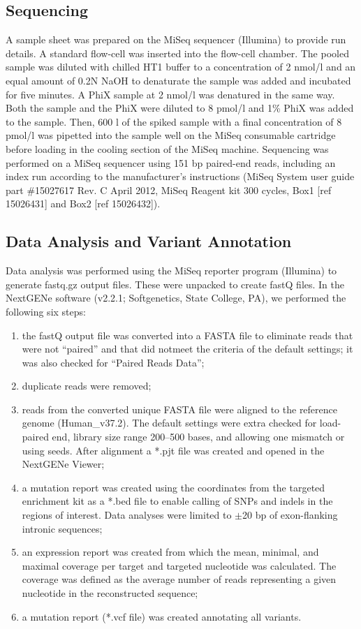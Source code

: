 \subsection{Sequencing}
A sample sheet was prepared on the MiSeq sequencer (Illumina) to provide run details. 
A standard flow-cell was inserted into the flow-cell chamber. 
The pooled sample was diluted with chilled HT1 buffer to a concentration of 2 nmol/l and an equal amount of 0.2N NaOH to denaturate the sample was added and incubated for five minutes. 
A PhiX sample at 2 nmol/l was denatured in the same way. 
Both the sample and the PhiX were diluted to 8 pmol/l and 1\% PhiX was added to the sample. 
Then, 600 {\textmu}l of the spiked sample with a final concentration of 8 pmol/l was pipetted into the sample well on the MiSeq consumable cartridge before loading in the cooling section of the MiSeq machine. 
Sequencing was performed on a MiSeq sequencer using 151 bp paired-end reads, including an index run according to the manufacturer’s instructions (MiSeq System user guide part \#15027617 Rev. C April 2012, MiSeq Reagent kit 300 cycles, Box1 [ref 15026431] and Box2 [ref 15026432]).

\subsection{Data Analysis and Variant Annotation}

Data analysis was performed using the MiSeq reporter program (Illumina) to generate fastq.gz output files. 
These were unpacked to create fastQ files. 
In the NextGENe software (v2.2.1; Softgenetics, State College, PA), we performed the following six steps:
\begin{enumerate}
\item the fastQ output file was converted into a FASTA file to eliminate reads that were not “paired” and that did notmeet the criteria of the default settings; it was also checked for “Paired Reads Data”;
\item duplicate reads were removed; 
\item reads from the converted unique FASTA file were aligned to the reference genome (Human\_v37.2). The default settings were extra checked for load-paired end, library size range 200–500 bases, and allowing one mismatch or using seeds. After alignment a *.pjt file was created and opened in the NextGENe Viewer;
\item a mutation report was created using the coordinates from the targeted enrichment kit as a *.bed file to enable calling of SNPs and indels in the regions of interest. 
Data analyses were limited to $\pm$20 bp of exon-flanking intronic sequences;
\item an expression report was created from which the mean, minimal, and maximal coverage per target and targeted nucleotide was calculated. The coverage was defined as the average number of reads representing a given nucleotide in the reconstructed sequence;
\item a mutation report (*.vcf file) was created annotating all variants.
\end{enumerate}

